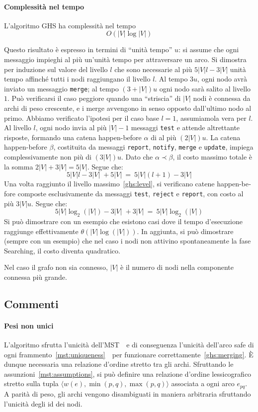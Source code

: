 \documentclass[target=bach,aauheader=,style=]{thud}
\newcommand{\eng}[1]{\foreignlanguage{english}{#1}}
\begin{document}
\paragraph{Complessità nel tempo}\label{ghs:complexity:time}
L'algoritmo GHS ha complessità nel tempo
$$
O(|V|\log|V|)
$$

Questo risultato è espresso in termini di ``unità tempo'' $u$: si assume che ogni messaggio impieghi al più un'unità tempo per attraversare un arco. Si dimostra per induzione sul valore del livello $l$ che sono necessarie al più $5|V|l-3|V|$ unità tempo affinché tutti i nodi raggiungano il livello $l$. Al tempo $3u$, ogni nodo avrà inviato un messaggio \lstinline{merge}; al tempo $(3+|V|)u$ ogni nodo sarà salito al livello $1$. Può verificarsi il caso peggiore quando una ``striscia'' di $|V|$ nodi è connessa da archi di peso crescente, e i \eng{merge} avvengono in senso opposto dall'ultimo nodo al primo. Abbiamo verificato l'ipotesi per il caso base $l=1$, assumiamola vera per $l$. Al livello $l$, ogni nodo invia al più $|V|-1$ messaggi \lstinline{test} e attende altrettante risposte, formando una catena \eng{happen-before} $\alpha$ di al più $(2|V|)u$. La catena \eng{happen-before} $\beta$, costituita da messaggi \lstinline{report}, \lstinline{notify}, \lstinline{merge} e \lstinline{update}, impiega complessivamente non più di $(3|V|)u$. Dato che $\alpha\prec\beta$, il costo massimo totale è la somma $2|V|+3|V|=5|V|$. Segue che:
$$
5|V|l-3|V|\;+5|V|\:=\:5|V|(l+1)-3|V|
$$
Una volta raggiunto il livello massimo~\ref{ghs:level}, si verificano catene \eng{happen-before} composte esclusivamente da messaggi \lstinline{test}, \lstinline{reject} e \lstinline{report}, con costo al più $3|V|u$. Segue che:
$$
5|V|\log_2(|V|)-3|V|\;+3|V|\:=\:5|V|\log_2(|V|)
$$
Si può dimostrare con un esempio che esistono casi dove il tempo d'esecuzione raggiunge effettivamente $\theta(|V|\log(|V|))$. In aggiunta, si può dimostrare (sempre con un esempio) che nel caso i nodi non attivino spontaneamente la fase \eng{Searching}, il costo diventa quadratico.

Nel caso il grafo non sia connesso, $|V|$ è il numero di nodi nella componente connessa più grande.

\subsection{Commenti}

\paragraph{Pesi non unici}\label{ghs:weights}
L'algoritmo sfrutta l'unicità dell'MST \,\textendash\, e di conseguenza l'unicità dell'arco \eng{safe} di ogni frammento~\ref{mst:uniqueness} \,\textendash\, per funzionare correttamente~\ref{ghs:merging}. È dunque necessaria una relazione d'ordine stretto tra gli archi. Sfruttando le assunzioni~\ref{mst:assumptions}, si può definire una relazione d'ordine lessicografico stretto sulla tupla $\langle w(e),\min(p,q),\max(p,q)\rangle$ associata a ogni arco $e_{pq}$. A parità di peso, gli archi vengono disambiguati in maniera arbitraria sfruttando l'unicità degli id dei nodi.
\end{document}
